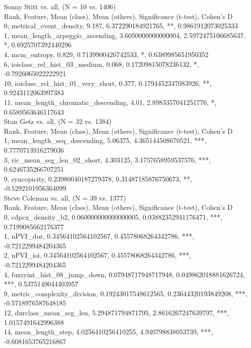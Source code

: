 Sonny Stitt vs. all, (N = 10 vs. 1406)\\
Rank, Feature, Mean (class), Mean (others), Significance (t-test), Cohen's D\\
0, metrical_event_density, 9.187, 6.372290184921765, **, 0.9861912073025333\\
1, mean_length_arpeggio_ascending, 3.6050000000000004, 2.5972475106685637, *, 0.6925707392440296\\
4, mcm_entropy, 0.829, 0.7139900426742533, *, 0.6389985651950352\\
6, ioiclass_rel_hist_03_medium, 0.068, 0.17209815078236132, *, -0.7926065022222921\\
10, ioiclass_rel_hist_01_very_short, 0.377, 0.1794452347083926, **, 0.9243112063997383\\
11, mean_length_chromatic_descending, 4.01, 2.8983357041251776, *, 0.6589563646117643\\
Stan Getz vs. all, (N = 32 vs. 1384)\\
Rank, Feature, Mean (class), Mean (others), Significance (t-test), Cohen's D\\
1, mean_length_seq_descending, 5.06375, 4.365144508670521, ***, 0.7770713916279036\\
3, ric_mean_seg_len_02_short, 4.303125, 3.1757658959537576, ***, 0.6246735266707251\\
9, syncopicity, 0.23980040187279378, 0.31487185876750673, **, -0.5292101956364099\\
Steve Coleman vs. all, (N = 39 vs. 1377)\\
Rank, Feature, Mean (class), Mean (others), Significance (t-test), Cohen's D\\
0, cdpcx_density_b2, 0.060000000000000005, 0.03882352941176471, ***, 0.7199085662176377\\
1, nPVI_dur, 0.34564102564102567, 0.45578068264342786, ***, -0.7212299484204365\\
2, nPVI_ioi, 0.34564102564102567, 0.45578068264342786, ***, -0.7212299484204365\\
4, fuzzyint_hist_08_jump_down, 0.07948717948717948, 0.049862018881626724, ***, 0.5375149044403957\\
9, metric_complexity_division, 0.19243017548612565, 0.23644320193849208, ***, -0.5718976587648185\\
12, durclass_mean_seg_len, 5.294871794871795, 2.8616267247639797, ***, 1.0157491642996388\\
14, mean_length_step, 4.0256410256410255, 4.940798838053739, ***, -0.6081653765216867\\
